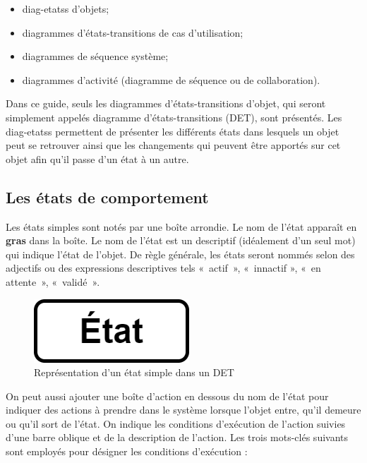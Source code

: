 \begin{itemize}
	\item \glspl{diag-etats} d'objets;
	\item diagrammes d'états-transitions de cas d'utilisation;
	\item diagrammes de séquence système;
	\item diagrammes d'activité (diagramme de séquence ou de collaboration).
\end{itemize}

Dans ce guide, seuls les diagrammes d'états-transitions d'objet, qui seront simplement appelés diagramme d'états-transitions (\acrshort{DET}), sont présentés.  Les \glspl{diag-etats} permettent de présenter les différents états dans lesquels un objet peut se retrouver ainsi que les changements qui peuvent être apportés sur cet objet afin qu'il passe d'un état à un autre. 


\subsection{Les états de comportement}

Les états simples sont notés par une boîte arrondie. Le nom de l'état apparaît en {\bfseries gras} dans la boîte. Le nom de l'état est un descriptif (idéalement d'un seul mot) qui indique l'état de l'objet. De règle générale, les états seront nommés selon des adjectifs ou des expressions descriptives tels «~actif~», «~innactif », «~en attente~», «~validé~».

\begin{figure}[H]
	\caption{Représentation d'un état simple dans un \acrshort{DET}}
	\centering
	\includegraphics[scale=0.2]{etat1.png}
\end{figure}

On peut aussi ajouter une boîte d'action  en dessous du nom de l'état pour indiquer des actions à prendre dans le système lorsque l'objet entre, qu'il demeure ou qu'il sort de l'état. On indique les conditions d'exécution de l'action suivies d'une barre oblique et de la description de l'action. Les trois mots-clés suivants sont employés pour désigner les conditions d'exécution :

